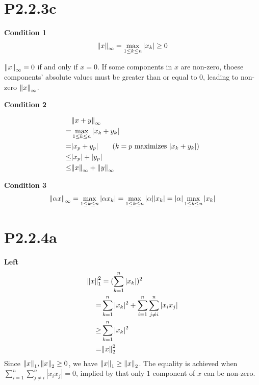 \documentclass{article}
\begin{document}
\section*{P2.2.3c}
\textbf{Condition 1}
\begin{align*}
    \norm{x}_\infty = \max_{1\le k\le n} |x_k| \ge 0
\end{align*}

$\norm{x}_\infty=0$ if and only if $x=0$. If some components in $x$ are non-zero,
thoese components' absolute values must be greater than or equal to $0$, leading to non-zero $\norm{x}_\infty$.

\textbf{Condition 2}

\begin{align*}
        & \norm{x+y}_\infty                                             \\
    =   & \max_{1\le k\le n}|x_k+y_k|                                   \\
    =   & |x_p+y_p|                \tag*{($k=p$ maximizes $|x_k+y_k|$)} \\
    \le & |x_p|+|y_p|                                                   \\
    \le & \norm{x}_\infty+\norm{y}_\infty
\end{align*}

\textbf{Condition 3}
\begin{align*}
    \norm{\alpha x}_\infty =\max_{1\le k\le n}|\alpha x_k| =\max_{1\le k\le n}|\alpha||x_k|=|\alpha|\max_{1\le k\le n}|x_k|
\end{align*}

\section*{P2.2.4a}

\textbf{Left}
\begin{align*}
    \norm{x}_1^2
        & = (\sum_{k=1}^n |x_k|)^2                                      \\
    =   & \sum_{k=1}^n |x_k|^2  + \sum_{i=1}^n\sum_{j\neq i}^n |x_ix_j| \\
    \ge & \sum_{k=1}^n |x_k|^2                                          \\
    =   & \norm{x}_2^2
\end{align*}
Since $\norm{x}_1,\norm{x}_2 \ge 0$, we have $\norm{x}_1 \ge \norm{x}_2$.
The equality is achieved when ${\sum_{i=1}^n\sum_{j\neq i}^n |x_ix_j|=0}$,
implied by that only $1$ component of $x$ can be non-zero.
\end{document}
